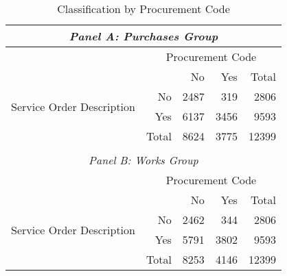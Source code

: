 \begin{table}[!htbp]
  \caption{\label{tab:textbycode}Classification by Procurement Code}
  \centering
  \small
  \begin{tabular}{crrrr}
    \hline

    \hline
    \multicolumn{5}{c}{\emph{Panel A: Purchases Group}} \T \B \\
    \hline
    & \multicolumn{4}{c}{\parbox{.25\textwidth}{\centering Procurement Code}} \T \B \\
    \multicolumn{1}{c}{\multirow{4}{*}{\parbox[c][][c]{.15\textwidth}{\centering Service Order Description}}} & \multicolumn{1}{l}{} & No & Yes & Total \T \B \\
                         \cline{2-5}
    \multicolumn{1}{c}{} & No        & 2487      & 319      & 2806  \T \B \\
    \multicolumn{1}{c}{} & Yes       & 6137      & 3456     & 9593  \T \B \\
                         \cline{2-5}
    \multicolumn{1}{c}{} & Total     & 8624      & 3775     & 12399 \T \B \\
    & & & & \\
    \hline
    \multicolumn{5}{c}{\emph{Panel B: Works Group}} \T \B \\
    \hline
    & \multicolumn{4}{c}{\parbox{.25\textwidth}{\centering Procurement Code}} \T \B \\
    \multirow{4}{*}{\parbox[c][][c]{.15\textwidth}{\centering Service Order Description}}                     & \multicolumn{1}{l}{} & No & Yes & Total \T \B \\
                         \cline{2-5}
                         & No        & 2462      & 344       & 2806  \T \B \\
                         & Yes       & 5791      & 3802      & 9593  \T \B \\
                         \cline{2-5}
                         & Total     & 8253      & 4146      & 12399 \T \B \\
    \hline

    \hline
  \end{tabular}
\end{table}